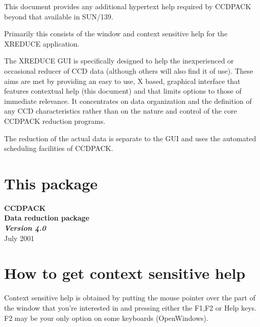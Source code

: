\documentclass[11pt]{article}
\newcommand{\stardocinitials}  {HRH}
\newcommand{\stardocnumber}    {1.0}
\newcommand{\stardocdate}      {July 2001}
\newcommand{\stardocversion}   {Version 4.0}
\newcommand{\stardocname}{\stardocinitials /\stardocnumber}
\newenvironment{latexonly}{}{}
\newcommand{\xref}[3]{#1}
\newcommand{\xlabel}[1]{}
\newcommand{\latexonlytoc}[0]{\tableofcontents}
\begin{document}
This document provides any additional hypertext help required by
\xref{CCDPACK}{sun139}{} beyond that available in SUN/139.

Primarily this consists of the window and context sensitive help
for the \xref{XREDUCE}{sun139}{XREDUCE} application.

The XREDUCE GUI is specifically designed to help the inexperienced or
occasional reducer of CCD data (although others will also find it of
use). These aims are met by providing an easy to use, X based,
graphical interface that features contextual help (this document) and
that limits options to those of immediate relevance. It concentrates
on data organization and the definition of any CCD characteristics
rather than on the nature and control of the core CCDPACK reduction
programs.

The reduction of the actual data is separate to the GUI and uses the
automated scheduling facilities of CCDPACK.


\begin{latexonly}
  \setlength{\parskip}{0mm}
  \latexonlytoc
  \setlength{\parskip}{\medskipamount}
  \markright{\stardocname}
\end{latexonly}
\section{This package \xlabel{OnVersion}}
\begin{center}
{\Huge \bf  CCDPACK \\
\LARGE Data reduction package \\
\Large \em \stardocversion \\
}
\stardocdate
\end{center}

\section{How to get context sensitive help \xlabel{OnContext}}
Context sensitive help is obtained by putting the mouse pointer over
the part of the window that you're interested in and pressing either
the F1,F2 or Help keys. F2 may be your only option on some keyboards
(OpenWindows).
\end{document}
